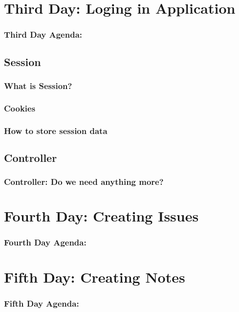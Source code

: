 \documentclass{beamer}
\theoremstyle{mystyle}
\begin{document}
\section{Third Day: Loging in Application}
    \begin{frame}
      \frametitle{Third Day Agenda:}
      \tableofcontents
      [
      currentsection,
      sectionstyle=hide/hide,
      subsectionstyle=show/show/hide
      ]
    \end{frame}
  \subsection{Session}
    \begin{frame}
      \frametitle{What is Session?}
    \end{frame}
    \subsubsection{Cookies}
      \begin{frame}
        \frametitle{How to store session data}
      \end{frame}
      \subsection{Controller}
      \begin{frame}
        \frametitle{Controller: Do we need anything more?}
      \end{frame}
 

\section{Fourth Day: Creating Issues}
    \begin{frame}
      \frametitle{Fourth Day Agenda:}
      \tableofcontents
      [
      currentsection,
      sectionstyle=hide/hide,
      subsectionstyle=show/show/hide
      ]
    \end{frame}

\section{Fifth Day: Creating Notes}
    \begin{frame}
      \frametitle{Fifth Day Agenda:}
      \tableofcontents
      [
      currentsection,
      sectionstyle=hide/hide,
      subsectionstyle=show/show/hide
      ]
    \end{frame}
  
\end{document}

